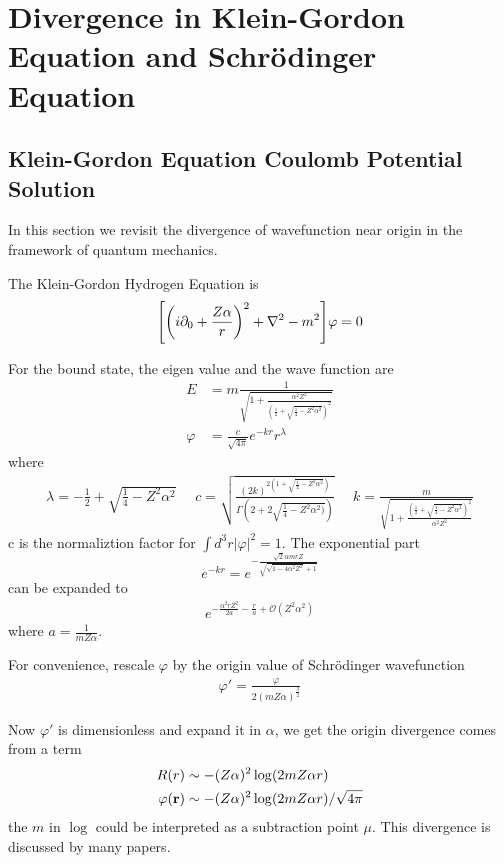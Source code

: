 \documentclass[aps,prd,preprint,showkeys,10pt]{revtex4-1}
\renewcommand{\a}{\alpha}
\begin{document}
\section{Divergence in Klein-Gordon Equation and Schr\"odinger Equation\label{sec:qm}}
\subsection{Klein-Gordon Equation Coulomb Potential Solution}
In this section we revisit the divergence of wavefunction near origin in the framework of quantum mechanics.

The Klein-Gordon Hydrogen Equation is
\begin{align}
	\bqty{\pqty{i\partial_0+\frac{Z\alpha}{r}}^2+\nabla^2-m^2}\varphi=0
\end{align}

For the bound state, the eigen value and the wave function are\cite{Greiner2000}
\begin{align}
	E    & =m\frac{1}{\sqrt{1+\frac{\alpha^2 Z^2}{(\frac{1}{2}+\sqrt{\frac{1}{4}-Z^2\alpha^2})^2}}} \\
	\varphi & =\frac{c}{\sqrt{4\pi}}e^{-kr}r^\lambda
\end{align}
where
\begin{align}
	\lambda=-\frac{1}{2}+\sqrt{\frac{1}{4}-Z^2\alpha^2}\ \ \ \ \ \
	c=\sqrt{\frac{(2k)^{2(1+\sqrt{\frac{1}{4}-Z^2\alpha^2})}}{\Gamma(2+2\sqrt{\frac{1}{4}-Z^2\alpha^2)})}}\ \ \ \ \ \
	k=\frac{m}{\sqrt{1+\frac{(\frac{1}{2}+\sqrt{\frac{1}{4}-Z^2\alpha^2})^2}{\alpha^2Z^2}}}
\end{align}
c is the normaliztion factor for $\int d^3r|\varphi|^2=1$. The exponential part 
$$e^{-kr}=e^{-\frac{\sqrt{2} \alpha  m r Z}{\sqrt{\sqrt{1-4 \alpha ^2 Z^2}+1}}}$$
can be expanded to 
\begin{align*}
	e^{-\frac{\alpha ^2 r Z^2}{2 a}-\frac{r}{a}+\mathcal{O}(Z^2\a^2)}
\end{align*}
where $a=\frac{1}{mZ\a}$. 

For convenience, rescale $\varphi$ by the origin value of Schr\"odinger wavefunction
\begin{align}
	\varphi '=\frac{\varphi}{2(mZ\alpha)^\frac{3}{2}}
\end{align}

Now $\varphi '$ is dimensionless and expand it in $\alpha$, we get the origin divergence comes from a term
\begin{align}
	R(r)         & \sim-(Z\alpha)^2\log(2m Z \a r)             \\
	\varphi(\vb{r}) & \sim-(Z\alpha)^2\log(2m Z \a r)/\sqrt{4\pi}
\end{align}
the $m$ in $\log$ could be interpreted as a subtraction point $\mu$. This divergence is discussed by many papers\cite{Chen2007,Chen2009}.
\end{document}
